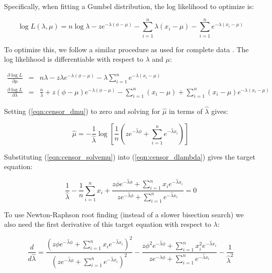 Specifically, when fitting a Gumbel distribution, the log likelihood
to optimize is:

\begin{equation}
  \log L(\lambda, \mu) = 
    n \log \lambda 
     - z e^{-\lambda(\phi - \mu)}
     - \sum_{i=1}^{n} \lambda(x_i - \mu) 
     - \sum_{i=1}^{n} e^{-\lambda(x_i - \mu)}
\label{eqn:censor_logL}
\end{equation}

To optimize this, we follow a similar procedure as used for complete
data \citep{Lawless82}. The log likelihood is differentiable with
respect to $\lambda$ and $\mu$:

\begin{eqnarray}
\frac{\partial \log L}{\partial \mu} & = &
n \lambda  
- z \lambda e^{-\lambda (\phi - \mu)}
- \lambda \sum_{i=1}^{n} e^{-\lambda (x_i - \mu)}
\label{eqn:censor_dmu}
\\%
\frac{\partial \log L}{\partial \lambda} & = &
\frac{n}{\lambda} 
+ z (\phi - \mu) e^{-\lambda (\phi - \mu)}
- \sum_{i=1}^{n} (x_i - \mu) 
+ \sum_{i=1}^{n} (x_i - \mu) e^{-\lambda (x_i - \mu)}
\label{eqn:censor_dlambda}
\end{eqnarray}

Setting (\ref{eqn:censor_dmu}) to zero and solving for $\hat{\mu}$ in
terms of $\hat{\lambda}$ gives:

\begin{equation}
\hat{\mu}  =  - \frac{1}{\hat{\lambda}} 
	\log \left[ \frac{1}{n} 
	\left( z e^{-\hat{\lambda} \phi} 
               + \sum_{i=1}^{n} e^{-\hat{\lambda} x_i} \right)
	\right]
\label{eqn:censor_solvemu}
\end{equation}

Substituting (\ref{eqn:censor_solvemu}) into
(\ref{eqn:censor_dlambda}) gives the target equation:

\begin{equation}
\frac{1}{\hat{\lambda}} 
- \frac{1}{n} \sum_{i=1}^{n} x_i +
\frac{z \phi e^{-\hat{\lambda} \phi} + \sum_{i=1}^{n} x_i e^{-\hat{\lambda} x_i}} 
     {z e^{-\hat{\lambda} \phi} + \sum_{i=1}^{n} e^{-\hat{\lambda} x_i}} 
 =  0
\label{eqn:censor_newtontarget}
\end{equation}

To use Newton-Raphson root finding (instead of a slower bisection
search) we also need the first derivative of this target equation with
respect to $\lambda$:

\begin{equation}
\frac{d}{d\hat{\lambda}} = 
\frac{\left( 
        z \phi e^{-\hat{\lambda} \phi}
        + \sum_{i=1}^{n} x_i e^{-\hat{\lambda} x_i} 
       \right)^2 } 
     {\left( 
        z e^{-\hat{\lambda} \phi}
        + \sum_{i=1}^{n} e^{-\hat{\lambda} x_i}     
       \right)^2 }
-
\frac{z \phi^2 e^{-\hat{\lambda} \phi} + \sum_{i=1}^{n} x_i^2 e^{-\hat{\lambda} x_i}}
     {z  e^{-\hat{\lambda} \phi} + \sum_{i=1}^{n} e^{-\hat{\lambda} x_i}}
-
\frac{1}{\hat{\lambda}^2}
\label{eqn:censor_newtonderiv}
\end{equation}

